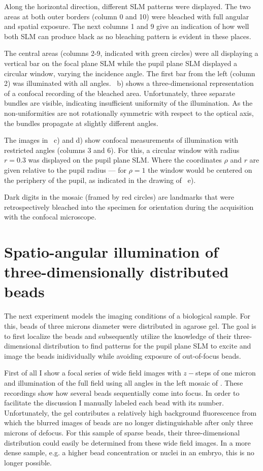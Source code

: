Along the horizontal direction, different SLM patterns were
displayed. The two areas at both outer borders (column 0 and 10) were
bleached with full angular and spatial exposure. The next columns 1
and 9 give an indication of how well both SLM can produce black as no
bleaching pattern is evident in these places.

The  central areas (columns 2-9,
indicated with green circles) were all displaying a vertical bar on
the focal plane SLM while the pupil plane SLM displayed a circular
window, varying the incidence angle. The first bar from the left
(column 2) was illuminated with all
angles. ~b) shows a three-dimensional
representation of a confocal recording of the bleached
area. Unfortunately, three separate bundles are visible, indicating
insufficient uniformity of the illumination.  As the non-uniformities
are not rotationally symmetric with respect to the optical axis, the
bundles propagate at slightly different angles.

The images in ~c) and d) show confocal
measurements of illumination with restricted angles (columns 3 and
6). For this, a circular window with radius $r=0.3$ was displayed on
the pupil plane SLM. Where the coordinates $\rho$ and $r$ are given
relative to the pupil radius --- for $\rho=1$ the window would be
centered on the periphery of the pupil, as indicated in the drawing
of ~e).

Dark digits in the mosaic (framed by red circles) are landmarks that were
retrospectively bleached into the specimen for orientation during the
acquisition with the confocal microscope.



\section{Spatio-angular illumination of three-dimensionally distributed beads}
\label{sec:beads_under}
The next experiment models the imaging conditions of a biological
sample. For this, beads of three microns diameter were distributed in
agarose gel. The goal is to first localize the beads and subsequently
utilize the knowledge of their three-dimensional distribution to find
patterns for the pupil plane SLM to excite and image the beads
inidividually while avoiding exposure of out-of-focus beads.

First of all  I show a focal series of wide
field images with $z-$steps of one micron and illumination of the full
field using all angles in the left mosaic of . These
recordings show how several beads sequentially come into focus. In
order to facilitate the discussion I manually labeled each bead with
its number. Unfortunately, the gel contributes a relatively high
background fluorescence from which the blurred images of beads are no
longer distinguishable after only three microns of defocus. For this
sample of sparse beads, their three-dimensional distribution could
easily be determined from these wide field images. In a more dense
sample, e.g. a higher bead concentration or nuclei in an embryo, this
is no longer possible.


